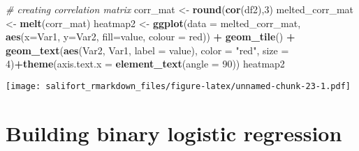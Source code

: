 \documentclass[
]{article}
\newenvironment{Shaded}{\begin{snugshade}}{\end{snugshade}}
\newcommand{\AttributeTok}[1]{\textcolor[rgb]{0.13,0.29,0.53}{#1}}
\newcommand{\CommentTok}[1]{\textcolor[rgb]{0.56,0.35,0.01}{\textit{#1}}}
\newcommand{\ConstantTok}[1]{\textcolor[rgb]{0.56,0.35,0.01}{#1}}
\newcommand{\DecValTok}[1]{\textcolor[rgb]{0.00,0.00,0.81}{#1}}
\newcommand{\FunctionTok}[1]{\textcolor[rgb]{0.13,0.29,0.53}{\textbf{#1}}}
\newcommand{\NormalTok}[1]{#1}
\newcommand{\OtherTok}[1]{\textcolor[rgb]{0.56,0.35,0.01}{#1}}
\newcommand{\SpecialCharTok}[1]{\textcolor[rgb]{0.81,0.36,0.00}{\textbf{#1}}}
\newcommand{\StringTok}[1]{\textcolor[rgb]{0.31,0.60,0.02}{#1}}
\begin{document}
\begin{Shaded}
\begin{Highlighting}[]
\CommentTok{\# creating correlation matrix}
\NormalTok{corr\_mat }\OtherTok{\textless{}{-}} \FunctionTok{round}\NormalTok{(}\FunctionTok{cor}\NormalTok{(df2),}\DecValTok{3}\NormalTok{)}
\NormalTok{melted\_corr\_mat }\OtherTok{\textless{}{-}} \FunctionTok{melt}\NormalTok{(corr\_mat)}
\NormalTok{heatmap2 }\OtherTok{\textless{}{-}} \FunctionTok{ggplot}\NormalTok{(}\AttributeTok{data =}\NormalTok{ melted\_corr\_mat, }\FunctionTok{aes}\NormalTok{(}\AttributeTok{x=}\NormalTok{Var1, }\AttributeTok{y=}\NormalTok{Var2, }\AttributeTok{fill=}\NormalTok{value, }\AttributeTok{colour =} \StringTok{\textquotesingle{}red\textquotesingle{}}\NormalTok{)) }\SpecialCharTok{+}
  \FunctionTok{geom\_tile}\NormalTok{() }\SpecialCharTok{+} \FunctionTok{geom\_text}\NormalTok{(}\FunctionTok{aes}\NormalTok{(Var2, Var1, }\AttributeTok{label =}\NormalTok{ value), }
            \AttributeTok{color =} \StringTok{"red"}\NormalTok{, }\AttributeTok{size =} \DecValTok{4}\NormalTok{)}\SpecialCharTok{+}\FunctionTok{theme}\NormalTok{(}\AttributeTok{axis.text.x =} \FunctionTok{element\_text}\NormalTok{(}\AttributeTok{angle =} \DecValTok{90}\NormalTok{))}
\NormalTok{heatmap2}
\end{Highlighting}
\end{Shaded}

\texttt{[image: salifort\_rmarkdown\_files/figure-latex/unnamed-chunk-23-1.pdf]}

\section{Building binary logistic
regression}\label{building-binary-logistic-regression}

\begin{Shaded}
\end{Shaded}
\end{document}
